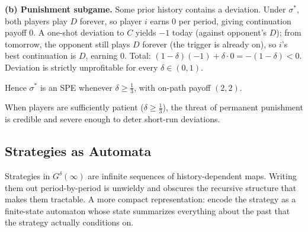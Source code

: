 {{\smallskip
\noindent\textbf{(b) Punishment subgame.} Some prior history contains a deviation. Under $\sigma^*$, both players play $D$ forever, so player $i$ earns $0$ per period, giving continuation payoff $0$. A one-shot deviation to $C$ yields $-1$ today (against opponent's $D$); from tomorrow, the opponent still plays $D$ forever (the trigger is already on), so $i$'s best continuation is $D$, earning $0$. Total: $(1-\delta)(-1) + \delta \cdot 0 = -(1-\delta) < 0$. Deviation is strictly unprofitable for every $\delta \in (0, 1)$.

Hence $\sigma^*$ is an SPE whenever $\delta \ge \tfrac{1}{3}$, with on-path payoff $(2, 2)$.
}


When players are sufficiently patient ($\delta \ge \tfrac{1}{3}$), the threat of permanent punishment is credible and severe enough to deter short-run deviations.
}

\subsection{Strategies as Automata}

Strategies in $G^\delta(\infty)$ are infinite sequences of history-dependent maps. Writing them out period-by-period is unwieldy and obscures the recursive structure that makes them tractable. A more compact representation: encode the strategy as a finite-state automaton whose state summarizes everything about the past that the strategy actually conditions on.

